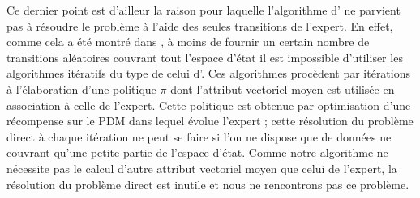 \documentclass[publibook-draft]{CAp2012}
\begin{document}
 Ce dernier point est d'ailleur la raison pour laquelle l'algorithme d'\citet{abbeel2004apprenticeship} ne parvient pas à résoudre le problème à l'aide des seules transitions de l'expert.
En effet, comme cela a été montré dans \citep{klein2011batch}, à moins de fournir un certain nombre de transitions aléatoires couvrant tout l'espace d'état il est impossible d'utiliser les algorithmes itératifs du type de celui d'\citet{abbeel2004apprenticeship}. Ces algorithmes procèdent par itérations à l'élaboration d'une politique $\pi$ dont l'attribut vectoriel moyen est utilisée en association à celle de l'expert. Cette politique est obtenue par optimisation d'une récompense sur le PDM dans lequel évolue l'expert ; cette résolution du problème direct à chaque itération ne peut se faire si l'on ne dispose que de données ne couvrant qu'une petite partie de l'espace d'état. Comme notre algorithme ne nécessite pas le calcul d'autre attribut vectoriel moyen que celui de l'expert, la résolution du problème direct est inutile et nous ne rencontrons pas ce problème.
\end{document}
